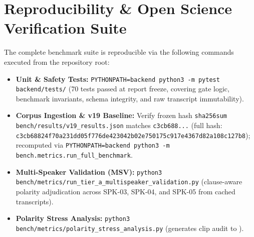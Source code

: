\documentclass[9pt,a4paper]{extarticle}
\begin{document}
\section{Reproducibility \& Open Science Verification Suite}
The complete benchmark suite is reproducible via the following commands executed from the repository root:
\begin{itemize}[leftmargin=*,itemsep=0.1pt,topsep=0.2pt,parsep=0pt]
  \item \textbf{Unit \& Safety Tests:} \texttt{PYTHONPATH=backend python3 -m pytest backend/tests/} (70 tests passed at report freeze, covering gate logic, benchmark invariants, schema integrity, and raw transcript immutability).
  \item \textbf{Corpus Ingestion \& v19 Baseline:} Verify frozen hash \texttt{sha256sum bench/results/v19\_results.json} matches \texttt{c3cb688...} (full hash: \texttt{c3cb68824f70a231dd05f776de423042b02e750175c917e4367d82a108c127b8}); recomputed via \texttt{PYTHONPATH=backend python3 -m bench.metrics.run\_full\_benchmark}.
  \item \textbf{Multi-Speaker Validation (MSV):} \texttt{python3 bench/metrics/run\_tier\_a\_multispeaker\_validation.py} (clause-aware polarity adjudication across SPK-03, SPK-04, and SPK-05 from cached transcripts).
  \item \textbf{Polarity Stress Analysis:} \texttt{python3 bench/metrics/polarity\_stress\_analysis.py} (generates clip audit to ).
\end{itemize}
\end{document}

